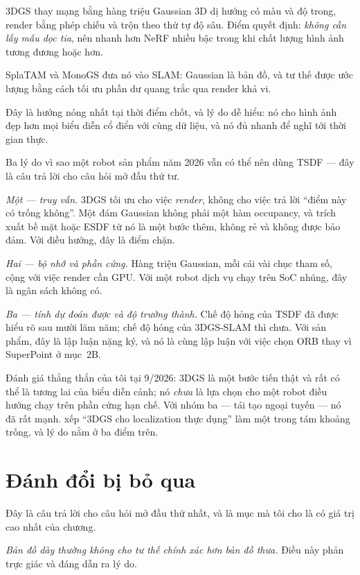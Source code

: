\documentclass[../../vslam.tex]{subfiles}
\begin{document}
3DGS \cite{kerbl20233dgs} thay mạng bằng hàng triệu Gaussian \(3\)D dị hướng có màu và độ trong, render bằng phép chiếu và trộn theo thứ tự độ sâu. Điểm quyết định: \emph{không cần lấy mẫu dọc tia}, nên nhanh hơn NeRF nhiều bậc trong khi chất lượng hình ảnh tương đương hoặc hơn.

SplaTAM \cite{keetha2024splatam} và MonoGS \cite{matsuki2024monogs} đưa nó vào SLAM: Gaussian là bản đồ, và tư thế được ước lượng bằng cách tối ưu phần dư quang trắc qua render khả vi.

Đây là hướng nóng nhất tại thời điểm chốt, và lý do dễ hiểu: nó cho hình ảnh đẹp hơn mọi biểu diễn cổ điển với cùng dữ liệu, và nó đủ nhanh để nghĩ tới thời gian thực.

Ba lý do vì sao một robot sản phẩm năm 2026 vẫn có thể nên dùng TSDF --- đây là câu trả lời cho câu hỏi mở đầu thứ tư.

\emph{Một --- truy vấn.} 3DGS tối ưu cho việc \emph{render}, không cho việc trả lời ``điểm này có trống không''. Một đám Gaussian không phải một hàm occupancy, và trích xuất bề mặt hoặc ESDF từ nó là một bước thêm, không rẻ và không được bảo đảm. Với điều hướng, đây là điểm chặn.

\emph{Hai --- bộ nhớ và phần cứng.} Hàng triệu Gaussian, mỗi cái vài chục tham số, cộng với việc render cần GPU. Với một robot dịch vụ chạy trên SoC nhúng, đây là ngân sách không có.

\emph{Ba --- tính dự đoán được và độ trưởng thành.} Chế độ hỏng của TSDF đã được hiểu rõ sau mười lăm năm; chế độ hỏng của 3DGS-SLAM thì chưa. Với sản phẩm, đây là lập luận nặng ký, và nó là cùng lập luận với việc chọn ORB thay vì SuperPoint ở  mục~2B.

Đánh giá thẳng thắn của tôi tại 9/2026: 3DGS là một bước tiến thật và rất có thể là tương lai của biểu diễn cảnh; nó \emph{chưa} là lựa chọn cho một robot điều hướng chạy trên phần cứng hạn chế. Với nhóm ba --- tái tạo ngoại tuyến --- nó đã rất mạnh.  xếp ``3DGS cho localization thực dụng'' làm một trong tám khoảng trống, và lý do nằm ở ba điểm trên.

\section{Đánh đổi bị bỏ qua}

Đây là câu trả lời cho câu hỏi mở đầu thứ nhất, và là mục mà tôi cho là có giá trị cao nhất của chương.

\emph{Bản đồ dày thường không cho tư thế chính xác hơn bản đồ thưa.} Điều này phản trực giác và đáng dẫn ra lý do.
\end{document}
